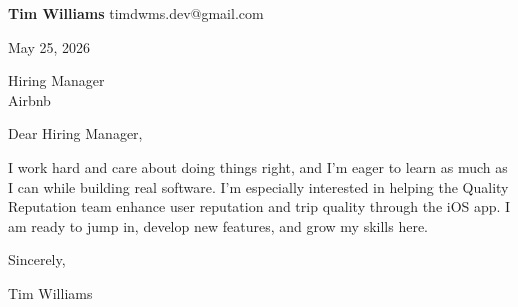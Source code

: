 \documentclass[12pt]{article}
\begin{document}
\textbf{Tim Williams} \hfill timdwms.dev@gmail.com

\vspace{1em}

May 25, 2026

\vspace{1em}

Hiring Manager \\
Airbnb

\vspace{1em}

Dear Hiring Manager,

I work hard and care about doing things right, and I'm eager to learn as much as I can while building real software. I'm especially interested in helping the Quality Reputation team enhance user reputation and trip quality through the iOS app. I am ready to jump in, develop new features, and grow my skills here.

\vspace{1em}

Sincerely,

\vspace{2em}

Tim Williams
\end{document}
